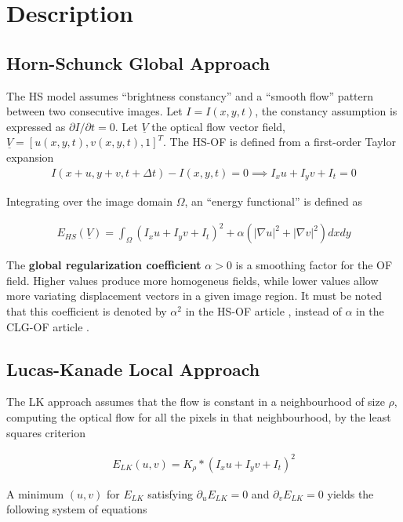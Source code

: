 \documentclass{article}
\begin{document}
\section{Description}

\subsection{Horn-Schunck Global Approach}

The HS model assumes ``brightness constancy'' and a ``smooth flow'' pattern 
between two consecutive images. Let $I = I(x,y,t)$, the constancy assumption 
is expressed as $\partial I / \partial t = 0$. Let $\underline{V}$ the optical 
flow vector field, $\underline{V} = [u(x,y,t),v(x,y,t),1]^T$. The HS-OF is 
defined from a first-order Taylor expansion
\begin{align}
I(x+u, y+v, t + \Delta t) - I(x, y, t) = 0 \implies I_x u + I_y v  + I_t = 0
\end{align}

Integrating over the image domain $\Omega$, an ``energy functional'' is defined
as

\begin{align}
E_{HS}(\underline{V}) = \int_{\Omega}(I_xu+I_yv+I_t)^2
                                      + \alpha(|\nabla u|^2+|\nabla v|^2)dxdy
\end{align}

The \textbf{global regularization coefficient} $\alpha > 0$ is a smoothing factor 
for the OF field. Higher values produce more homogeneus fields, while lower 
values allow more variating displacement vectors in a given image region. It must 
be noted that this coefficient is denoted by $\alpha^2$ in the HS-OF article 
\cite{HS81}, instead of $\alpha$ in the CLG-OF article \cite{Bruhn02}.


\subsection{Lucas-Kanade Local Approach}

The LK approach assumes that the flow is constant in a neighbourhood of size 
$\rho$, computing the optical flow for all the pixels in that neighbourhood, 
by the least squares criterion

\begin{align}
E_{LK}(u,v)=K_{\rho} * (I_x u + I_y v + I_t)^2
\end{align}

A minimum $(u,v)$ for $E_{LK}$ satisfying $\partial_uE_{LK} = 0$ and 
$\partial_vE_{LK} = 0$ yields the following system of equations
\end{document}
